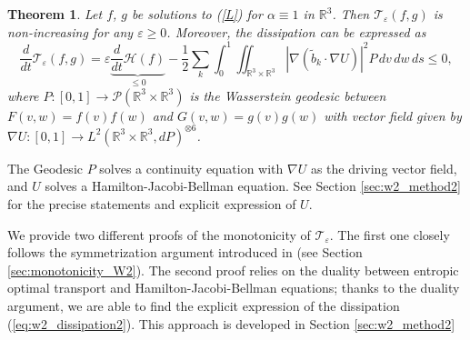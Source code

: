 \documentclass[11pt]{amsart}
\numberwithin{equation}{section}
\newtheorem{theorem}{Theorem}
\begin{document}

\begin{theorem}\label{thm:w2_dissipation}
  Let $f$, $g$ be solutions to (\ref{L}) for $\alpha \equiv 1$ in $\mathbb{R}^3$. Then $\mathcal T_\varepsilon (f,g)$ is non-increasing for any $\varepsilon\geq 0$. Moreover, the dissipation can be expressed as 
  \begin{equation}\label{eq:w2_dissipation2}
    \frac{d}{dt}\mathcal T_\varepsilon(f,g) = \varepsilon \underbrace{\frac{d}{dt} \mathcal H(f)}_{\le 0} - \frac{1}{2}\sum_k\int_0^1\iint_{\mathbb{R}^3\times\mathbb{R}^3} \left|\nabla(\tilde b_k\cdot \nabla U)\right|^2 P \,dv\,dw\,ds\le 0,
  \end{equation}
  where $P:[0,1]\to\mathcal{P}(\mathbb{R}^3\times\mathbb{R}^3)$ is the Wasserstein geodesic between $F(v,w)=f(v)f(w)$ and $G(v,w)=g(v)g(w)$ with vector field given by ${\nabla U:[0,1]\to L^2(\mathbb{R}^3\times\mathbb{R}^3,dP)^{\otimes 6}}$. 
\end{theorem}

The Geodesic $P$ solves a continuity equation with $\nabla U$ as the driving vector field, and $U$ solves a Hamilton-Jacobi-Bellman equation. See Section \ref{sec:w2_method2} for the precise statements and explicit expression of $U$.

We provide two different proofs of the monotonicity of $\mathcal T_\varepsilon$. The first one closely follows the symmetrization argument introduced in  \cite{GS24} (see Section \ref{sec:monotonicity_W2}). The second proof relies on the duality between entropic optimal transport and Hamilton-Jacobi-Bellman equations; thanks to the duality argument, we are able to find the explicit expression of the dissipation (\ref{eq:w2_dissipation2}). This approach is developed in Section \ref{sec:w2_method2}
\end{document}
